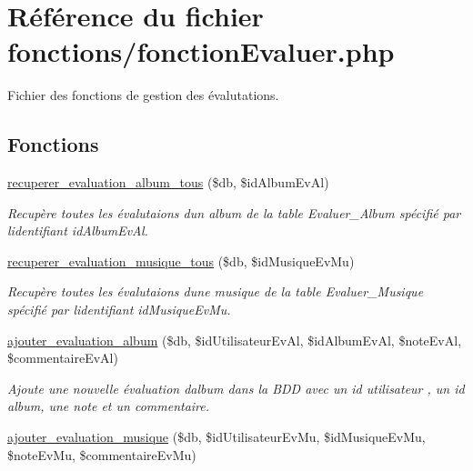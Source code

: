 \hypertarget{fonctionEvaluer_8php}{}\section{Référence du fichier fonctions/fonction\+Evaluer.php}
\label{fonctionEvaluer_8php}


Fichier des fonctions de gestion des évalutations.  


\subsection*{Fonctions}
\begin{DoxyCompactItemize}
\item 
\hyperlink{fonctionEvaluer_8php_afd7e91f214250ef49d12204b0796df3d}{recuperer\+\_\+evaluation\+\_\+album\+\_\+tous} (\$db, \$id\+Album\+Ev\+Al)
\begin{DoxyCompactList}\small\item\em Recupère toutes les évalutaions d\textquotesingle{}un album de la table Evaluer\+\_\+\+Album spécifié par l\textquotesingle{}identifiant \textquotesingle{}id\+Album\+Ev\+Al\textquotesingle{}. \end{DoxyCompactList}\item 
\hyperlink{fonctionEvaluer_8php_ad547c7fb3b9ad3a279ad461867d827b6}{recuperer\+\_\+evaluation\+\_\+musique\+\_\+tous} (\$db, \$id\+Musique\+Ev\+Mu)
\begin{DoxyCompactList}\small\item\em Recupère toutes les évalutaions d\textquotesingle{}une musique de la table Evaluer\+\_\+\+Musique spécifié par l\textquotesingle{}identifiant \textquotesingle{}id\+Musique\+Ev\+Mu\textquotesingle{}. \end{DoxyCompactList}\item 
\hyperlink{fonctionEvaluer_8php_ac12baf472e96e6ae3b5147e6014bf830}{ajouter\+\_\+evaluation\+\_\+album} (\$db, \$id\+Utilisateur\+Ev\+Al, \$id\+Album\+Ev\+Al, \$note\+Ev\+Al, \$commentaire\+Ev\+Al)
\begin{DoxyCompactList}\small\item\em Ajoute une nouvelle évaluation d\textquotesingle{}album dans la B\+DD avec un id utilisateur , un id album, une note et un commentaire. \end{DoxyCompactList}\item 
\hyperlink{fonctionEvaluer_8php_a921a20a89ee517170203db03940ce10b}{ajouter\+\_\+evaluation\+\_\+musique} (\$db, \$id\+Utilisateur\+Ev\+Mu, \$id\+Musique\+Ev\+Mu, \$note\+Ev\+Mu, \$commentaire\+Ev\+Mu)

\end{DoxyCompactItemize}
